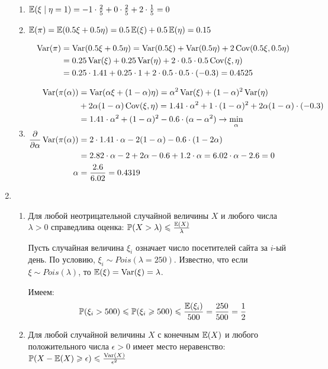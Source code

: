 \begin{enumerate}
\begin{enumerate}
\item $\operatorname{\mathbb{E}}(\xi \mid \eta = 1) = -1 \cdot \frac{2}{5} + 0 \cdot \frac{2}{5} + 2 \cdot \frac{1}{5} = 0$
\item $\operatorname{\mathbb{E}}(\pi) = \operatorname{\mathbb{E}}(0.5 \xi + 0.5 \eta) = 0.5 \operatorname{\mathbb{E}}(\xi) + 0.5 \operatorname{\mathbb{E}}(\eta) = 0.15$

\begin{align*}
\operatorname{Var}(\pi) &= \operatorname{Var}(0.5 \xi + 0.5 \eta) = \operatorname{Var}(0.5 \xi) + \operatorname{Var}(0.5\eta) + 2 \operatorname{Cov} (0.5\xi, 0.5\eta) \\
&= 0.25\operatorname{Var}(\xi) + 0.25\operatorname{Var}(\eta) + 2 \cdot 0.5 \cdot 0.5 \operatorname{Cov}(\xi, \eta) \\
&= 0.25 \cdot 1.41 + 0.25 \cdot 1 + 2 \cdot 0.5 \cdot 0.5 \cdot (-0.3) = 0.4525
\end{align*}
\item
\begin{align*}
\operatorname{Var}(\pi(\alpha)) &= \operatorname{Var}(\alpha \xi + (1-\alpha)\eta) = \alpha^2\operatorname{Var}(\xi) + (1-\alpha)^2 \operatorname{Var}(\eta) \\
&+ 2\alpha(1-\alpha) \operatorname{Cov}(\xi, \eta) = 1.41 \cdot \alpha^2 + 1\cdot (1-\alpha)^2 + 2\alpha(1-\alpha) \cdot (-0.3) \\
&= 1.41 \cdot \alpha^2 + (1-\alpha)^2 - 0.6 \cdot (\alpha - \alpha^2) \to \min_\alpha \\
\frac{\partial}{\partial \alpha} \operatorname{Var}(\pi(\alpha)) &= 2 \cdot 1.41 \cdot \alpha -2(1-\alpha) -0.6\cdot(1-2\alpha) \\
&= 2.82 \cdot \alpha - 2 + 2\alpha - 0.6 + 1.2 \cdot \alpha = 6.02 \cdot \alpha - 2.6 = 0 \\
\alpha &= \frac{2.6}{6.02} = 0.4319
\end{align*}
\end{enumerate}
\item \begin{enumerate}
\item Для любой неотрицательной случайной величины $X$ и любого числа $\lambda > 0$ справедлива оценка: $\operatorname{\mathbb{P}}(X>\lambda) \leqslant \frac{\operatorname{\mathbb{E}}(X)}{\lambda}$

Пусть случайная величина $\xi_i$ означает число посетителей сайта за $i$-ый день. По условию, $\xi_i \sim Pois(\lambda=250)$. Известно, что если $\xi \sim Pois(\lambda)$, то $\operatorname{\mathbb{E}}(\xi) = \operatorname{Var}(\xi) = \lambda$.

Имеем:
\[
\operatorname{\mathbb{P}}(\xi_i >500) \leqslant \operatorname{\mathbb{P}}(\xi_i \geqslant 500) \leqslant \frac{\operatorname{\mathbb{E}}(\xi_i)}{500} = \frac{250}{500} = \frac{1}{2}
\]
\item Для любой случайной величины $X$ с конечным $\operatorname{\mathbb{E}}(X)$ и любого положительного числа $\epsilon > 0$ имеет место неравенство: $\operatorname{\mathbb{P}}(X-\operatorname{\mathbb{E}}(X)\geqslant\epsilon)\leqslant\frac{\operatorname{Var}(X)}{\epsilon^2}$


\end{enumerate}
\end{enumerate}
